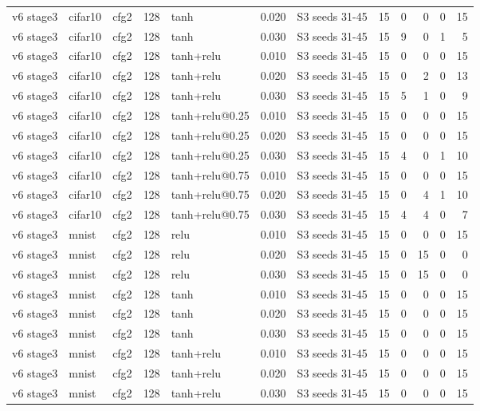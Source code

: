 \begin{table}[htbp]
{\begin{tabular}{@{}lllrlrlrrrrr@{}}
v6 stage3 & cifar10 & cfg2 & 128 & tanh & 0.020 & S3 seeds 31-45 & 15 & 0 & 0 & 0 & 15 \\
v6 stage3 & cifar10 & cfg2 & 128 & tanh & 0.030 & S3 seeds 31-45 & 15 & 9 & 0 & 1 & 5 \\
v6 stage3 & cifar10 & cfg2 & 128 & tanh+relu & 0.010 & S3 seeds 31-45 & 15 & 0 & 0 & 0 & 15 \\
v6 stage3 & cifar10 & cfg2 & 128 & tanh+relu & 0.020 & S3 seeds 31-45 & 15 & 0 & 2 & 0 & 13 \\
v6 stage3 & cifar10 & cfg2 & 128 & tanh+relu & 0.030 & S3 seeds 31-45 & 15 & 5 & 1 & 0 & 9 \\
v6 stage3 & cifar10 & cfg2 & 128 & tanh+relu@0.25 & 0.010 & S3 seeds 31-45 & 15 & 0 & 0 & 0 & 15 \\
v6 stage3 & cifar10 & cfg2 & 128 & tanh+relu@0.25 & 0.020 & S3 seeds 31-45 & 15 & 0 & 0 & 0 & 15 \\
v6 stage3 & cifar10 & cfg2 & 128 & tanh+relu@0.25 & 0.030 & S3 seeds 31-45 & 15 & 4 & 0 & 1 & 10 \\
v6 stage3 & cifar10 & cfg2 & 128 & tanh+relu@0.75 & 0.010 & S3 seeds 31-45 & 15 & 0 & 0 & 0 & 15 \\
v6 stage3 & cifar10 & cfg2 & 128 & tanh+relu@0.75 & 0.020 & S3 seeds 31-45 & 15 & 0 & 4 & 1 & 10 \\
v6 stage3 & cifar10 & cfg2 & 128 & tanh+relu@0.75 & 0.030 & S3 seeds 31-45 & 15 & 4 & 4 & 0 & 7 \\
v6 stage3 & mnist & cfg2 & 128 & relu & 0.010 & S3 seeds 31-45 & 15 & 0 & 0 & 0 & 15 \\
v6 stage3 & mnist & cfg2 & 128 & relu & 0.020 & S3 seeds 31-45 & 15 & 0 & 15 & 0 & 0 \\
v6 stage3 & mnist & cfg2 & 128 & relu & 0.030 & S3 seeds 31-45 & 15 & 0 & 15 & 0 & 0 \\
v6 stage3 & mnist & cfg2 & 128 & tanh & 0.010 & S3 seeds 31-45 & 15 & 0 & 0 & 0 & 15 \\
v6 stage3 & mnist & cfg2 & 128 & tanh & 0.020 & S3 seeds 31-45 & 15 & 0 & 0 & 0 & 15 \\
v6 stage3 & mnist & cfg2 & 128 & tanh & 0.030 & S3 seeds 31-45 & 15 & 0 & 0 & 0 & 15 \\
v6 stage3 & mnist & cfg2 & 128 & tanh+relu & 0.010 & S3 seeds 31-45 & 15 & 0 & 0 & 0 & 15 \\
v6 stage3 & mnist & cfg2 & 128 & tanh+relu & 0.020 & S3 seeds 31-45 & 15 & 0 & 0 & 0 & 15 \\
v6 stage3 & mnist & cfg2 & 128 & tanh+relu & 0.030 & S3 seeds 31-45 & 15 & 0 & 0 & 0 & 15 \\

\end{tabular}}
\end{table}

